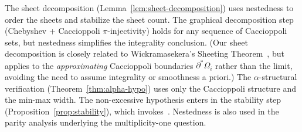 \begin{remark}\label{rem:integrality-independence}
The sheet decomposition (Lemma~\ref{lem:sheet-decomposition}) uses nestedness to order the sheets and stabilize the sheet count. The graphical decomposition step (Chebyshev + Caccioppoli $\pi$-injectivity) holds for any sequence of Caccioppoli sets, but nestedness simplifies the integrality conclusion. (Our sheet decomposition is closely related to Wickramasekera's Sheeting Theorem~\cite[Theorem~3.3]{Wic14}, but applies to the \emph{approximating} Caccioppoli boundaries $\partial^*\Omega_i$ rather than the limit, avoiding the need to assume integrality or smoothness a priori.) The $\alpha$-structural verification (Theorem~\ref{thm:alpha-hypo}) uses only the Caccioppoli structure and the min-max width. The non-excessive hypothesis enters in the stability step (Proposition~\ref{prop:stability}), which invokes~\cite[Proposition~3.1]{CLS22}. Nestedness is also used in the parity analysis underlying the multiplicity-one question.
\end{remark}
